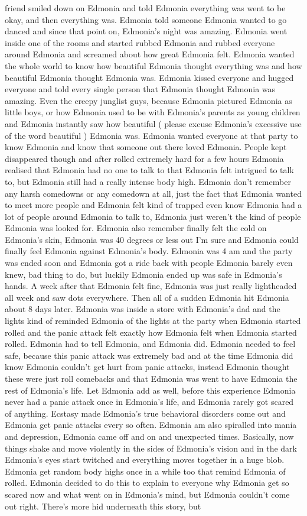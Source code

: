 \documentclass[12pt]{book}
\begin{document}
friend smiled down on Edmonia and told Edmonia everything was went to be okay, and then everything was. Edmonia told someone Edmonia wanted to go danced and since that point on, Edmonia's night was amazing. Edmonia went inside one of the rooms and started rubbed Edmonia and rubbed everyone around Edmonia and screamed about how great Edmonia felt. Edmonia wanted the whole world to know how beautiful Edmonia thought everything was and how beautiful Edmonia thought Edmonia was. Edmonia kissed everyone and hugged everyone and told every single person that Edmonia thought Edmonia was amazing. Even the creepy junglist guys, because Edmonia pictured Edmonia as little boys, or how Edmonia used to be with Edmonia's parents as young children and Edmonia instantly saw how beautiful ( please excuse Edmonia's excessive use of the word beautiful ) Edmonia was. Edmonia wanted everyone at that party to know Edmonia and know that someone out there loved Edmonia. People kept disappeared though and after rolled extremely hard for a few hours Edmonia realised that Edmonia had no one to talk to that Edmonia felt intrigued to talk to, but Edmonia still had a really intense body high. Edmonia don't remember any harsh comedowns or any comedown at all, just the fact that Edmonia wanted to meet more people and Edmonia felt kind of trapped even know Edmonia had a lot of people around Edmonia to talk to, Edmonia just weren't the kind of people Edmonia was looked for. Edmonia also remember finally felt the cold on Edmonia's skin, Edmonia was 40 degrees or less out I'm sure and Edmonia could finally feel Edmonia against Edmonia's body. Edmonia was 4 am and the party was ended soon and Edmonia got a ride back with people Edmonia barely even knew, bad thing to do, but luckily Edmonia ended up was safe in Edmonia's hands. A week after that Edmonia felt fine, Edmonia was just really lightheaded all week and saw dots everywhere. Then all of a sudden Edmonia hit Edmonia about 8 days later. Edmonia was inside a store with Edmonia's dad and the lights kind of reminded Edmonia of the lights at the party when Edmonia started rolled and the panic attack felt exactly how Edmonia felt when Edmonia started rolled. Edmonia had to tell Edmonia, and Edmonia did. Edmonia needed to feel safe, because this panic attack was extremely bad and at the time Edmonia did know Edmonia couldn't get hurt from panic attacks, instead Edmonia thought these were just roll comebacks and that Edmonia was went to have Edmonia the rest of Edmonia's life. Let Edmonia add as well, before this experience Edmonia never had a panic attack once in Edmonia's life, and Edmonia rarely got scared of anything. Ecstasy made Edmonia's true behavioral disorders come out and Edmonia get panic attacks every so often. Edmonia am also spiralled into mania and depression, Edmonia came off and on and unexpected times. Basically, now things shake and move violently in the sides of Edmonia's vision and in the dark Edmonia's eyes start twitched and everything moves together in a huge blob. Edmonia get random body highs once in a while too that remind Edmonia of rolled. Edmonia decided to do this to explain to everyone why Edmonia get so scared now and what went on in Edmonia's mind, but Edmonia couldn't come out right. There's more hid underneath this story, but 
\end{document}
